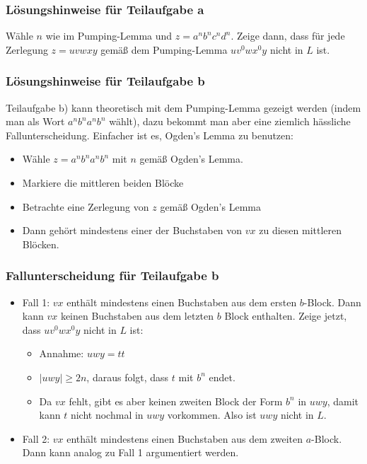 \documentclass{beamer}
\begin{document}
{\begin{frame}
\frametitle{Lösungshinweise für Teilaufgabe a}
 Wähle $n$ wie im Pumping-Lemma und $z=a^nb^nc^nd^n$. 
 Zeige dann, dass für jede Zerlegung $z=uvwxy$ gemäß dem Pumping-Lemma $uv^0wx^0y$ nicht in $L$ ist.
\end{frame}
\begin{frame}
 \frametitle{Lösungshinweise für Teilaufgabe b}      
 Teilaufgabe b) kann theoretisch mit dem Pumping-Lemma gezeigt werden (indem man als Wort $a^nb^na^nb^n$ wählt), dazu bekommt man aber eine ziemlich hässliche Fallunterscheidung.
       Einfacher ist es, Ogden's Lemma zu benutzen: 
       \begin{itemize}
        \item Wähle $z=a^nb^na^nb^n$ mit $n$ gemäß Ogden's Lemma.              
        \item Markiere die mittleren beiden Blöcke
        \item Betrachte eine Zerlegung von $z$ gemäß Ogden's Lemma
        \item Dann gehört mindestens einer der Buchstaben von $vx$ zu diesen mittleren Blöcken.
        \end{itemize}
\end{frame}
\begin{frame}
\frametitle{Fallunterscheidung für Teilaufgabe b}
\begin{itemize}
        \item Fall 1: $vx$ enthält mindestens einen Buchstaben aus dem ersten $b$-Block. 
              Dann kann $vx$ keinen Buchstaben aus dem letzten $b$ Block enthalten. 
              Zeige jetzt, dass $uv^0wx^0y$ nicht in $L$ ist: 
              \begin{itemize}
                \item Annahme: $uwy=tt$
                \item $|uwy| \geq 2n$, daraus folgt, dass $t$ mit $b^n$ endet.
                \item Da $vx$ fehlt, gibt es aber keinen zweiten Block der Form $b^n$ in $uwy$, damit kann $t$ nicht nochmal in $uwy$ vorkommen.
                      Also ist $uwy$ nicht in $L$.
              \end{itemize}
        \item Fall 2: $vx$ enthält mindestens einen Buchstaben aus dem zweiten $a$-Block. 
              Dann kann analog zu Fall 1 argumentiert werden. 
       \end{itemize}
\end{frame}

}
\end{document}

